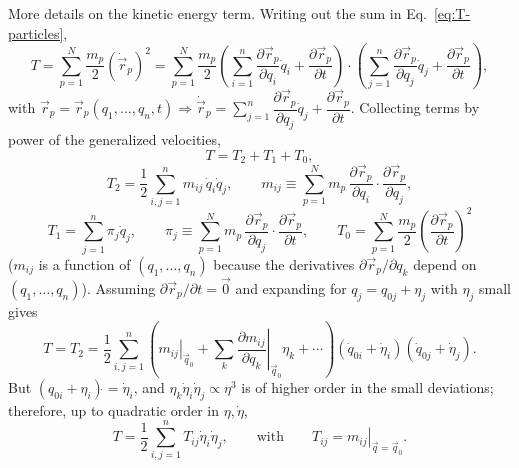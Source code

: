 \documentclass[11pt]{article}
\begin{document}
\begin{aside}
More details on the kinetic energy term. Writing out the sum in Eq.~\eqref{eq:T-particles},
\begin{equation}
T = \sum_{p=1}^N \frac{m_p}{2}\left(\dot{\vec r}_p\right)^2 = \sum_{p=1}^N\frac{m_p}{2}\left(\sum_{i=1}^n\frac{\partial\vec r_p}{\partial q_i}\dot q_i+\frac{\partial\vec r_p}{\partial t}\right)\cdot\left(\sum_{j=1}^n\frac{\partial \vec r_p}{\partial q_j}\dot q_j+\frac{\partial\vec r_p}{\partial t}\right),
\end{equation}
with $\vec r_p = \vec r_p(q_1,\dots,q_n,t) \Rightarrow \dot{\vec r}_p = \sum_{j=1}^n \dfrac{\partial\vec r_p}{\partial q_j}\dot q_j + \dfrac{\partial \vec r_p}{\partial t}$. Collecting terms by power of the generalized velocities,
\begin{equation}
T = T_2+T_1+T_0,
\end{equation}
\begin{equation}
T_2 = \frac12\sum_{i,j=1}^n m_{ij}\,\dot q_i\dot q_j, \qquad m_{ij}\equiv\sum_{p=1}^N m_p\,\frac{\partial\vec r_p}{\partial q_i}\cdot\frac{\partial\vec r_p}{\partial q_j},
\end{equation}
\begin{equation}
T_1 = \sum_{j=1}^n \pi_j\dot q_j, \qquad \pi_j\equiv\sum_{p=1}^N m_p\,\frac{\partial\vec r_p}{\partial q_j}\cdot\frac{\partial\vec r_p}{\partial t}, \qquad T_0 = \sum_{p=1}^N\frac{m_p}{2}\left(\frac{\partial\vec r_p}{\partial t}\right)^2
\end{equation}
($m_{ij}$ is a function of $(q_1,\dots,q_n)$ because the derivatives $\partial\vec r_p/\partial q_k$ depend on $(q_1,\dots,q_n)$). Assuming $\partial\vec r_p/\partial t = \vec 0$ and expanding for $q_j = q_{0j}+\eta_j$ with $\eta_j$ small gives
\begin{equation}
T = T_2 = \frac12\sum_{i,j=1}^n\left(\left.m_{ij}\right|_{\vec q_0} + \sum_k \left.\frac{\partial m_{ij}}{\partial q_k}\right|_{\vec q_0}\eta_k+\cdots\right)(\dot q_{0i}+\dot\eta_i)(\dot q_{0j}+\dot\eta_j).
\end{equation}
But $(q_{0i}+\eta_i)\dot{} = \dot\eta_i$, and $\eta_k\dot\eta_i\dot\eta_j\propto\eta^3$ is of higher order in the small deviations; therefore, up to quadratic order in $\eta,\dot\eta$,
\begin{equation}
\boxed{T = \frac12\sum_{i,j=1}^n T_{ij}\dot\eta_i\dot\eta_j, \qquad \text{with}\qquad T_{ij} = \left.m_{ij}\right|_{\vec q=\vec q_0}.}
\end{equation}
\end{aside}
\end{document}
